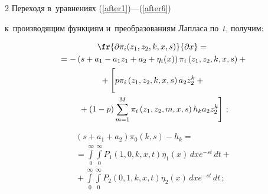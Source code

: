 \begin{multicols}{2}
Переходя в~уравнениях (\ref{after1})---(\ref{after6}) 


к~производящим функциям и~преобразованиям Лапласа по~$t$, получим:


\begin{multline*}


\fr{\partial \pi_i(z_1,z_2,k,x,s)}{\partial x}={}\\


{}=


-\left(s+a_1-a_1 z_1+a_2+\eta_i(x)\right)\pi_i\left(z_1,z_2,k,x,s\right)+{}\\


{}+\left[


\vphantom{\sum\limits_{m=1}^{M}}


p\pi_i\left(z_1,z_2,k,x,s\right)


a_2 z_2^k+{}\right.\\


\left.{}+(1-p)\sum\limits_{m=1}^{M}


\pi_i\left(z_1,z_2,m,x,s\right)h_k a_2 z_2^k\right]\,;




\end{multline*}





\vspace*{-12pt}





\noindent


\begin{multline}


\left(s+a_1+a_2\right)\pi_0(k,s)-h_k={}\\


{}=


\int\limits_0^{\infty}\int\limits_0^{\infty}P_1(1,0,k,x,t)\eta_1(x)\,dx e^{-st}\,dt+{}\\


{}+\int\limits_0^{\infty}\int\limits_0^{\infty}P_2(0,1,k,x,t)\eta_2(x)\,dx e^{-st}\,dt\,;


\label{second}


\end{multline}





\vspace*{-12pt}





\noindent



\end{multicols}
